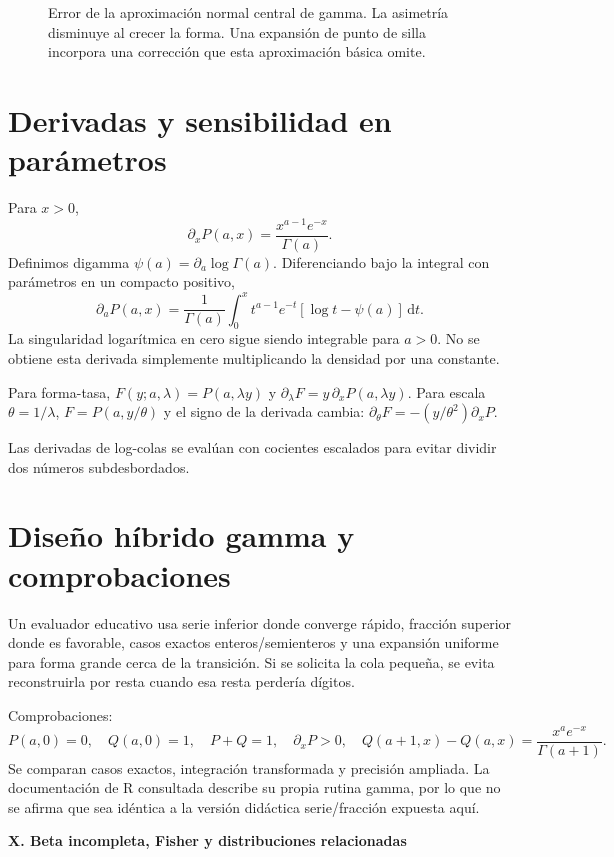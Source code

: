 \documentclass[11pt,a4paper]{article}
\newcommand{\dd}{\,\mathrm d}
\theoremstyle{definition}
\newcommand{\parte}[1]{\par\bigskip\Needspace{8\baselineskip}\begin{center}{\Large\bfseries\color{azul}#1}\end{center}}
\begin{document}
\begin{figure}[htbp]
\caption{Error de la aproximación normal central de gamma. La asimetría disminuye al crecer la forma. Una expansión de punto de silla incorpora una corrección que esta aproximación básica omite.}\label{fig:cdf-17}\end{figure}

\section{Derivadas y sensibilidad en parámetros}
Para $x>0$,
\[
\partial_xP(a,x)=\frac{x^{a-1}e^{-x}}{\Gamma(a)}.
\]
Definimos digamma $\psi(a)=\partial_a\log\Gamma(a)$. Diferenciando bajo la integral con parámetros en un compacto positivo,
\[
\partial_aP(a,x)=\frac1{\Gamma(a)}
\int_0^x t^{a-1}e^{-t}[\log t-\psi(a)]\dd t.
\]
La singularidad logarítmica en cero sigue siendo integrable para $a>0$. No se obtiene esta derivada simplemente multiplicando la densidad por una constante.

Para forma-tasa, $F(y;a,\lambda)=P(a,\lambda y)$ y
$\partial_\lambda F=y\,\partial_xP(a,\lambda y)$.
Para escala $\theta=1/\lambda$, $F=P(a,y/\theta)$ y el signo de la derivada cambia:
$\partial_\theta F=-(y/\theta^2)\partial_xP$.

Las derivadas de log-colas se evalúan con cocientes escalados para evitar dividir dos números subdesbordados.

\section{Diseño híbrido gamma y comprobaciones}
Un evaluador educativo usa serie inferior donde converge rápido, fracción superior donde es favorable, casos exactos enteros/semienteros y una expansión uniforme para forma grande cerca de la transición. Si se solicita la cola pequeña, se evita reconstruirla por resta cuando esa resta perdería dígitos.

Comprobaciones:
\[
P(a,0)=0,\quad Q(a,0)=1,\quad P+Q=1,\quad
\partial_xP>0,\quad
Q(a+1,x)-Q(a,x)=\frac{x^ae^{-x}}{\Gamma(a+1)}.
\]
Se comparan casos exactos, integración transformada y precisión ampliada. La documentación de R consultada describe su propia rutina gamma, por lo que no se afirma que sea idéntica a la versión didáctica serie/fracción expuesta aquí.


\parte{X. Beta incompleta, Fisher y distribuciones relacionadas}
\end{document}

